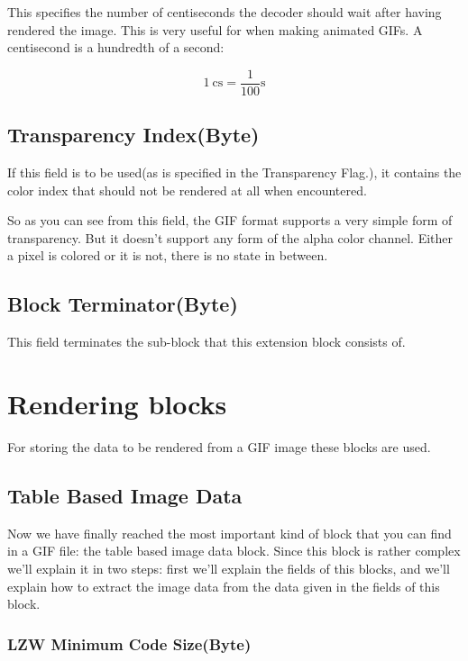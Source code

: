 \begin{refsection}
  This specifies the number of centiseconds the decoder should wait after
  having rendered the image. This is very useful for when making
  animated GIFs. A centisecond is a hundredth of a
  second:

  \begin{equation*}
    \SI{1}{\centi\second} = \frac{1}{100}\si{\second}
  \end{equation*}

  \subsection{Transparency Index(Byte)}

  If this field is to be used(as is specified in the Transparency
  Flag.), it contains the color index that should not be rendered at
  all when encountered.

  So as you can see from this field, the GIF format supports a very
  simple form of transparency. But it doesn't support any form of the
  alpha color channel. Either a pixel is colored or it is not, there is
  no state in between.

  \subsection{Block Terminator(Byte)}

  This field terminates the sub-block that this extension block
  consists of.

  \section{Rendering blocks}

  For storing the data to be rendered from a GIF image these blocks
  are used.

  \subsection{Table Based Image Data}

  Now we have finally reached the most important kind of block that
  you can find in a GIF file: the table based image data block. Since this
  block is rather complex we'll explain it in two steps: first we'll
  explain the fields of this blocks, and we'll explain how to extract
  the image data from the data given in the fields of this block.

  \subsubsection{LZW Minimum Code Size(Byte)}


\end{refsection}
